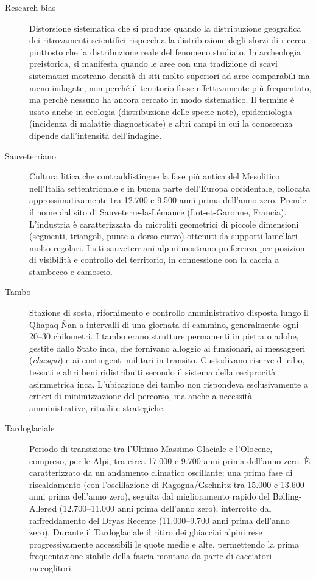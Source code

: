 \begin{description}
\item[Research bias] Distorsione sistematica che si produce quando la distribuzione geografica dei ritrovamenti scientifici rispecchia la distribuzione degli sforzi di ricerca piuttosto che la distribuzione reale del fenomeno studiato. In archeologia preistorica, si manifesta quando le aree con una tradizione di scavi sistematici mostrano densità di siti molto superiori ad aree comparabili ma meno indagate, non perché il territorio fosse effettivamente più frequentato, ma perché nessuno ha ancora cercato in modo sistematico. Il termine è usato anche in ecologia (distribuzione delle specie note), epidemiologia (incidenza di malattie diagnosticate) e altri campi in cui la conoscenza dipende dall'intensità dell'indagine.

\item[Sauveterriano] Cultura litica che contraddistingue la fase più antica del Mesolitico nell'Italia settentrionale e in buona parte dell'Europa occidentale, collocata approssimativamente tra 12.700 e 9.500 anni prima dell'anno zero. Prende il nome dal sito di Sauveterre-la-Lémance (Lot-et-Garonne, Francia). L'industria è caratterizzata da microliti geometrici di piccole dimensioni (segmenti, triangoli, punte a dorso curvo) ottenuti da supporti lamellari molto regolari. I siti sauveterriani alpini mostrano preferenza per posizioni di visibilità e controllo del territorio, in connessione con la caccia a stambecco e camoscio.

\item[Tambo] Stazione di sosta, rifornimento e controllo amministrativo disposta lungo il Qhapaq Ñan a intervalli di una giornata di cammino, generalmente ogni 20--30 chilometri. I tambo erano strutture permanenti in pietra o adobe, gestite dallo Stato inca, che fornivano alloggio ai funzionari, ai messaggeri (\textit{chasqui}) e ai contingenti militari in transito. Custodivano riserve di cibo, tessuti e altri beni ridistribuiti secondo il sistema della reciprocità asimmetrica inca. L'ubicazione dei tambo non rispondeva esclusivamente a criteri di minimizzazione del percorso, ma anche a necessità amministrative, rituali e strategiche.

\item[Tardoglaciale] Periodo di transizione tra l'Ultimo Massimo Glaciale e l'Olocene, compreso, per le Alpi, tra circa 17.000 e 9.700 anni prima dell'anno zero. È caratterizzato da un andamento climatico oscillante: una prima fase di riscaldamento (con l'oscillazione di Ragogna/Gschnitz tra 15.000 e 13.600 anni prima dell'anno zero), seguita dal miglioramento rapido del Bølling-Allerød (12.700--11.000 anni prima dell'anno zero), interrotto dal raffreddamento del Dryas Recente (11.000--9.700 anni prima dell'anno zero). Durante il Tardoglaciale il ritiro dei ghiacciai alpini rese progressivamente accessibili le quote medie e alte, permettendo la prima frequentazione stabile della fascia montana da parte di cacciatori-raccoglitori.


\end{description}
